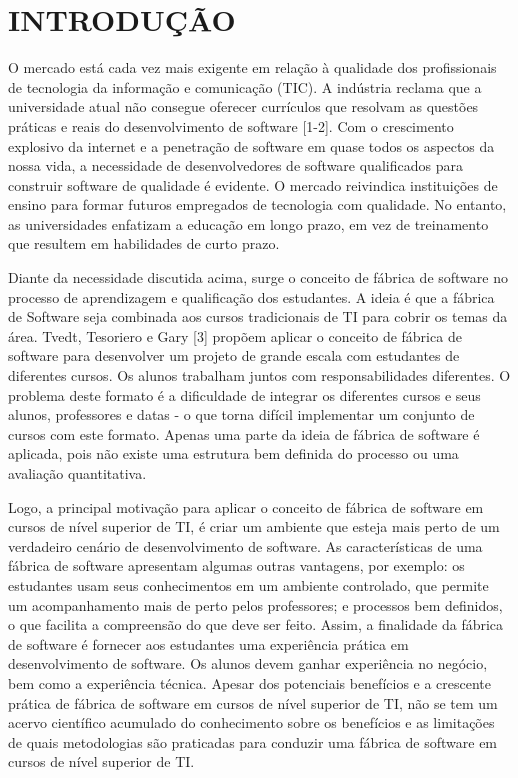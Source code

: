 
\section{INTRODUÇÃO}

O mercado está cada vez mais exigente em relação à qualidade dos profissionais de tecnologia da informação e comunicação (TIC). A indústria reclama que a universidade atual não consegue oferecer currículos que resolvam as questões práticas e reais do desenvolvimento de software [1-2]. Com o crescimento explosivo da internet e a penetração de software em quase todos os aspectos da nossa vida, a necessidade de desenvolvedores de software qualificados para construir software de qualidade é evidente. O mercado reivindica instituições de ensino para formar futuros empregados de tecnologia com qualidade. No entanto, as universidades enfatizam a educação em longo prazo, em vez de treinamento que resultem em habilidades de curto prazo.

Diante da necessidade discutida acima, surge o conceito de fábrica de software no processo de aprendizagem e qualificação dos estudantes. A ideia é que a fábrica de Software seja combinada aos cursos tradicionais de TI para cobrir os temas da área. Tvedt, Tesoriero e Gary [3] propõem aplicar o conceito de fábrica de software para desenvolver um projeto de grande escala com estudantes de diferentes cursos. Os alunos trabalham juntos com responsabilidades diferentes. O problema deste formato é a dificuldade de integrar os diferentes cursos e seus alunos, professores e datas - o que torna difícil implementar um conjunto de cursos com este formato. Apenas uma parte da ideia de fábrica de software é aplicada, pois não existe uma estrutura bem definida do processo ou uma avaliação quantitativa.

Logo, a principal motivação para aplicar o conceito de fábrica de software em cursos de nível superior de TI, é criar um ambiente que esteja mais perto de um verdadeiro cenário de desenvolvimento de software. As características de uma fábrica de software apresentam algumas outras vantagens, por exemplo: os estudantes usam seus conhecimentos em um ambiente controlado, que permite um acompanhamento mais de perto pelos professores; e processos bem definidos, o que facilita a compreensão do que deve ser feito. Assim, a finalidade da fábrica de software é fornecer aos estudantes uma experiência prática em desenvolvimento de software. Os alunos devem ganhar experiência no negócio, bem como a experiência técnica. Apesar dos potenciais benefícios e a crescente prática de fábrica de software em cursos de nível superior de TI, não se tem um acervo científico acumulado do conhecimento sobre os benefícios e as limitações de quais metodologias são praticadas para conduzir uma fábrica de software em cursos de nível superior de TI.

